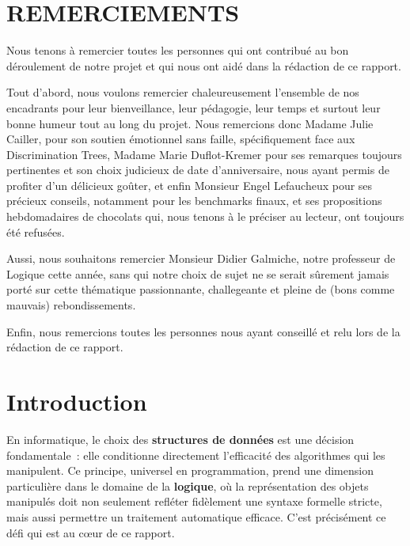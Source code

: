 \documentclass[11pt]{article}
\begin{document}
\newpage
\section*{REMERCIEMENTS}
Nous tenons à remercier toutes les personnes qui ont contribué au bon déroulement de notre projet
et qui nous ont aidé dans la rédaction de ce rapport.

Tout d'abord, nous voulons remercier chaleureusement l'ensemble de nos encadrants pour leur bienveillance,
leur pédagogie, leur temps et surtout leur bonne humeur tout au long du projet. 
Nous remercions donc Madame Julie Cailler, pour son soutien émotionnel sans faille, spécifiquement
face aux Discrimination Trees, Madame Marie Duflot-Kremer pour ses remarques toujours pertinentes et son
choix judicieux de date d'anniversaire, nous ayant permis de profiter d'un délicieux goûter, et enfin Monsieur Engel Lefaucheux
pour ses précieux conseils, notamment pour les benchmarks finaux, et ses propositions
hebdomadaires de chocolats qui, nous tenons à le préciser au lecteur, ont toujours été refusées.

Aussi, nous souhaitons remercier Monsieur Didier Galmiche, notre professeur de Logique cette année,
sans qui notre choix de sujet ne se serait sûrement jamais porté sur cette thématique passionnante, challegeante
et pleine de (bons comme mauvais) rebondissements. 

Enfin, nous remercions toutes les personnes nous ayant conseillé et relu lors de la rédaction
de ce rapport.



\newpage
\tableofcontents                                %
\newpage
\pagestyle{plain}
\setcounter{page}{1}                            %

{}  
\section*{Introduction}                         %
En informatique, le choix des \textbf{structures de données} est une décision 
fondamentale~: elle conditionne directement l'efficacité des algorithmes qui 
les manipulent. Ce principe, universel en programmation, prend une dimension 
particulière dans le domaine de la \textbf{logique}, où la représentation 
des objets manipulés doit non seulement refléter fidèlement une syntaxe 
formelle stricte, mais aussi permettre un traitement automatique 
efficace. C'est précisément ce défi qui est au cœur de ce rapport.
\end{document}
